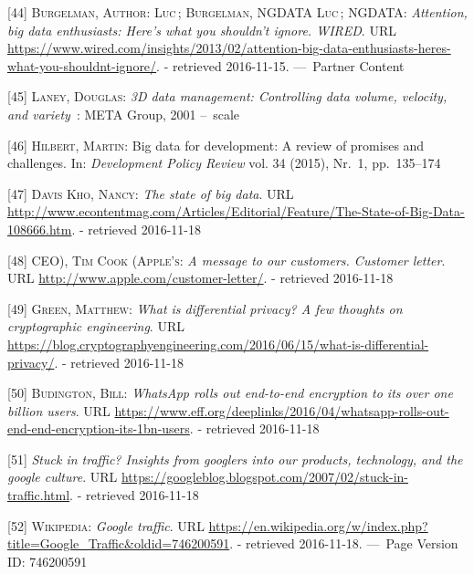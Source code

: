 \documentclass[12pt,english,a4paper,titlepage,cleardoublepage=empty,dottedtoc]{report}
\begin{document}
\hypertarget{ref-web_2016_big-data-enthusiasts-should-not-ignore}{}
{[}44{]} \textsc{Burgelman, Author: Luc}\,; \textsc{Burgelman, NGDATA
Luc}\,; \textsc{NGDATA}: \emph{Attention, big data enthusiasts: Here's
what you shouldn't ignore. WIRED}. URL
\url{https://www.wired.com/insights/2013/02/attention-big-data-enthusiasts-heres-what-you-shouldnt-ignore/}.
- retrieved 2016-11-15. ---~Partner Content

\hypertarget{ref-report_2001_3d-data-management-controlling-data-volume-velocity-and-variety}{}
{[}45{]} \textsc{Laney, Douglas}: \emph{3D data management: Controlling
data volume, velocity, and variety}~: META Group, 2001 --~scale

\hypertarget{ref-paper_2015_big-data-for-development-a-review-of-promises-and-challenges:more-data}{}
{[}46{]} \textsc{Hilbert, Martin}: Big data for development: A review of
promises and challenges. In: \emph{Development Policy Review} vol. 34
(2015), Nr.~1, pp.~135--174

\hypertarget{ref-web_2016_the-state-of-big-data}{}
{[}47{]} \textsc{Davis Kho, Nancy}: \emph{The state of big data}. URL
\url{http://www.econtentmag.com/Articles/Editorial/Feature/The-State-of-Big-Data-108666.htm}.
- retrieved 2016-11-18

\hypertarget{ref-web_2016_apple_customer-letter}{}
{[}48{]} \textsc{CEO), Tim Cook (Apple's}: \emph{A message to our
customers. Customer letter}. URL
\url{http://www.apple.com/customer-letter/}. - retrieved 2016-11-18

\hypertarget{ref-web_2016_what-is-differential-privacy}{}
{[}49{]} \textsc{Green, Matthew}: \emph{What is differential privacy? A
few thoughts on cryptographic engineering}. URL
\url{https://blog.cryptographyengineering.com/2016/06/15/what-is-differential-privacy/}.
- retrieved 2016-11-18

\hypertarget{ref-web_2016_eff_whatsapp-rolls-out-emd-to-end-encryption}{}
{[}50{]} \textsc{Budington, Bill}: \emph{WhatsApp rolls out end-to-end
encryption to its over one billion users}. URL
\url{https://www.eff.org/deeplinks/2016/04/whatsapp-rolls-out-end-end-encryption-its-1bn-users}.
- retrieved 2016-11-18

\hypertarget{ref-web_2007_introducing-google-traffic}{}
{[}51{]} \emph{Stuck in traffic? Insights from googlers into our
products, technology, and the google culture}. URL
\url{https://googleblog.blogspot.com/2007/02/stuck-in-traffic.html}. -
retrieved 2016-11-18

\hypertarget{ref-web_2016_wikipedia_google-traffic}{}
{[}52{]} \textsc{Wikipedia}: \emph{Google traffic}. URL
\url{https://en.wikipedia.org/w/index.php?title=Google_Traffic\&oldid=746200591}.
- retrieved 2016-11-18. ---~Page Version ID: 746200591
\end{document}

